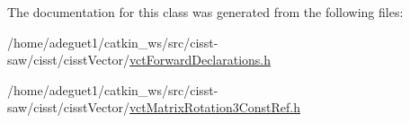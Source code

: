 The documentation for this class was generated from the following files\-:\begin{DoxyCompactItemize}
\item 
/home/adeguet1/catkin\-\_\-ws/src/cisst-\/saw/cisst/cisst\-Vector/\hyperlink{vct_forward_declarations_8h}{vct\-Forward\-Declarations.\-h}\item 
/home/adeguet1/catkin\-\_\-ws/src/cisst-\/saw/cisst/cisst\-Vector/\hyperlink{vct_matrix_rotation3_const_ref_8h}{vct\-Matrix\-Rotation3\-Const\-Ref.\-h}\end{DoxyCompactItemize}
